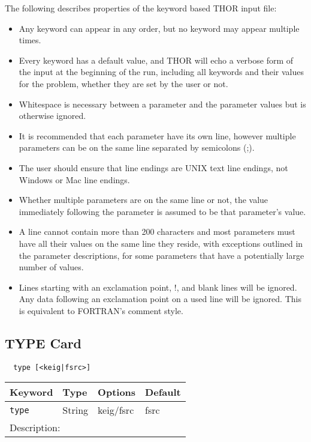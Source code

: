 The following describes properties of the keyword based THOR input file:
\begin{itemize}
  \item Any keyword can appear in any order, but no keyword may appear multiple times.
  \item Every keyword has a default value, and THOR will echo a verbose form of the input at the beginning of the run, including all keywords and their values for the problem, whether they are set by the user or not.
  \item Whitespace is necessary between a parameter and the parameter values but is otherwise ignored.
  \item It is recommended that each parameter have its own line, however multiple parameters can be on the same line separated by semicolons (;).
  \item The user should ensure that line endings are UNIX text line endings, not Windows or Mac line endings.
  \item Whether multiple parameters are on the same line or not, the value immediately following the parameter is assumed to be that parameter's value.
  \item A line cannot contain more than 200 characters and most parameters must have all their values on the same line they reside, with exceptions outlined in the parameter descriptions, for some parameters that have a potentially large number of values.
  \item Lines starting with an exclamation point, !, and blank lines will be ignored. Any data following an exclamation point on a used line will be ignored. This is equivalent to FORTRAN's comment style.
\end{itemize}

\subsection{TYPE Card}

\begin{verbatim}
  type [<keig|fsrc>]
\end{verbatim}

\begin{tabular}{|l | l | l | l|}
\hline
Keyword & Type & Options & Default \\ \hline
\verb"type" & String & keig/fsrc & fsrc \\ \hline
\multicolumn{4}{|l|}{Description: }\\
\hline
\end{tabular}

